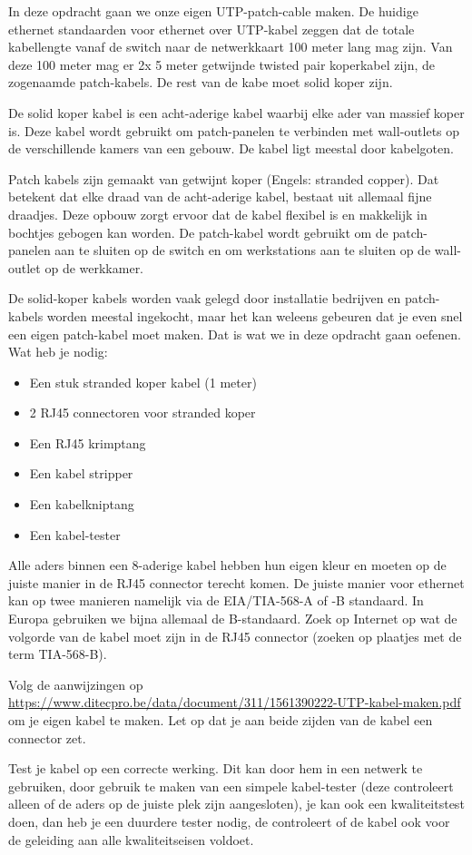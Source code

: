 In deze opdracht gaan we onze eigen UTP-patch-cable maken. De huidige ethernet standaarden voor ethernet over UTP-kabel zeggen dat de totale kabellengte vanaf de switch naar de netwerkkaart 100 meter lang mag zijn. Van deze 100 meter mag er 2x 5 meter getwijnde twisted pair koperkabel zijn, de zogenaamde patch-kabels. De rest van de kabe moet solid koper zijn.

De solid koper kabel is een acht-aderige kabel waarbij elke ader van massief koper is. Deze kabel wordt gebruikt om patch-panelen te verbinden met wall-outlets op de verschillende kamers van een gebouw. De kabel ligt meestal door kabelgoten.

Patch kabels zijn gemaakt van getwijnt koper (Engels: stranded copper). Dat betekent dat elke draad van de acht-aderige kabel, bestaat uit allemaal fijne draadjes. Deze opbouw zorgt ervoor dat de kabel flexibel is en makkelijk in bochtjes gebogen kan worden. De patch-kabel wordt gebruikt om de patch-panelen aan te sluiten op de switch en om werkstations aan te sluiten op de wall-outlet op de werkkamer.

De solid-koper kabels worden vaak gelegd door installatie bedrijven en patch-kabels worden meestal ingekocht, maar het kan weleens gebeuren dat je even snel een eigen patch-kabel moet maken. Dat is wat we in deze opdracht gaan oefenen. Wat heb je nodig:
\begin{itemize}
\item Een stuk stranded koper kabel (1 meter)
\item 2 RJ45 connectoren voor stranded koper
\item Een RJ45 krimptang
\item Een kabel stripper
\item Een kabelkniptang
\item Een kabel-tester
\end{itemize}

Alle aders binnen een 8-aderige kabel hebben hun eigen kleur en moeten op de juiste manier in de RJ45 connector terecht komen. De juiste manier voor ethernet kan op twee manieren namelijk via de EIA/TIA-568-A of -B standaard. In Europa gebruiken we bijna allemaal de B-standaard. Zoek op Internet op wat de volgorde van de kabel moet zijn in de RJ45 connector (zoeken op plaatjes met de term TIA-568-B).

Volg de aanwijzingen op \url{https://www.ditecpro.be/data/document/311/1561390222-UTP-kabel-maken.pdf} om je eigen kabel te maken. Let op dat je aan beide zijden van de kabel een connector zet.

Test je kabel op een correcte werking. Dit kan door hem in een netwerk te gebruiken, door gebruik te maken van een simpele kabel-tester (deze controleert alleen of de aders op de juiste plek zijn aangesloten), je kan ook een kwaliteitstest doen, dan heb je een duurdere tester nodig, de controleert of de kabel ook voor de geleiding aan alle kwaliteitseisen voldoet.
